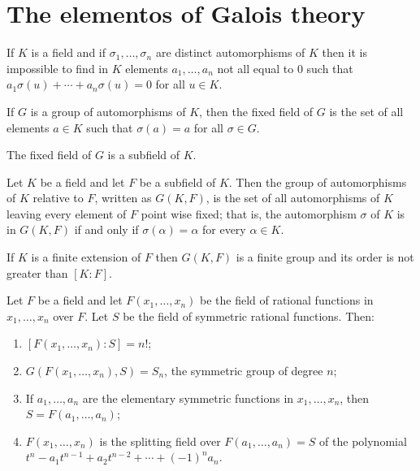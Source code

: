\section{The elementos of Galois theory}\label{sec:the_elementos_of_galois_theory}

\begin{theorem}\label{thm:distinct-field-automorphisms-are-linearly-independent}
	If $K$ is a field and if $\sigma_{1},\ldots,\sigma_{n}$ are distinct
	automorphisms of $K$ then it is impossible to find in $K$ elements
	$a_{1},\ldots,a_{n}$ not all equal to $0$ such that
	$a_{1}\sigma(u)+\cdots+a_{n}\sigma(u)=0$ for all ${u}\in{K}$.
\end{theorem}

\begin{definition}\label{def:fixed-field}
	If $G$ is a group of automorphisms of $K$, then the fixed field of $G$ is the
	set of all elements ${a}\in{K}$ such that $\sigma(a)=a$ for all
	${\sigma}\in{G}$.
\end{definition}

\begin{lemma}\label{lem:the-fixed-field-is-in-fact-a-subfield}
	The fixed field of $G$ is a subfield of $K$.
\end{lemma}

\begin{definition}\label{def:automorphism-group-relative-to-a-subfield}
	Let $K$ be a field and let $F$ be a subfield of $K$. Then the group of
	automorphisms of $K$ relative to $F$, written as $G(K,F)$, is the set of all
	automorphisms of $K$ leaving every element of $F$ point wise fixed; that is,
	the automorphism $\sigma$ of $K$ is in $G(K,F)$ if and only if
	$\sigma(\alpha)=\alpha$ for every ${\alpha}\in{K}$.
\end{definition}

\begin{theorem}\label{thm:finite-extensions-make-a-finite-relative-automorphism-group}
	If $K$ is a finite extension of $F$ then $G(K,F)$ is a finite group and its
	order is not greater than $[K:F]$.
\end{theorem}

\begin{theorem}\label{thm:symmetric-rational-functions}
	Let $F$ be a field and let $F(x_{1},\ldots,x_{n})$ be the field of rational
	functions in $x_{1},\ldots,x_{n}$ over $F$. Let $S$ be the field of symmetric
	rational functions. Then:
	\begin{enumerate}
		\item $[F(x_{1},\ldots,x_{n}):S]=n!$;
		\item $G(F(x_{1},\ldots,x_{n}),S)=S_{n}$, the symmetric group of degree $n$;
		\item If $a_{1},\ldots,a_{n}$ are the elementary symmetric functions in
		      $x_{1},\ldots,x_{n}$, then $S=F(a_{1},\ldots,a_{n})$;
		\item $F(x_{1},\ldots,x_{n})$ is the splitting field over
		      $F(a_{1},\ldots,a_{n})=S$ of the polynomial
		      $t^{n}-a_{1}t^{n-1}+a_{2}t^{n-2}+\cdots+(-1)^{n}a_{n}$.
	\end{enumerate}
\end{theorem}

